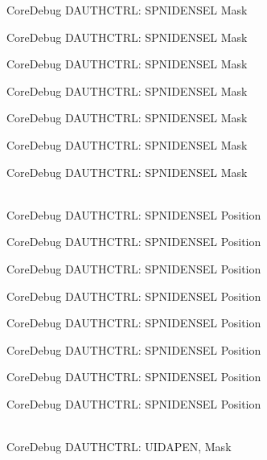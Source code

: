 \begin{DoxyRefList}
\label{deprecated__deprecated000142}%
%
Core\+Debug DAUTHCTRL:\+ SPNIDENSEL Mask 

\label{deprecated__deprecated000218}%
%
Core\+Debug DAUTHCTRL:\+ SPNIDENSEL Mask 

\label{deprecated__deprecated000281}%
%
Core\+Debug DAUTHCTRL:\+ SPNIDENSEL Mask 

\label{deprecated__deprecated000360}%
%
Core\+Debug DAUTHCTRL:\+ SPNIDENSEL Mask 

\label{deprecated__deprecated000436}%
%
Core\+Debug DAUTHCTRL:\+ SPNIDENSEL Mask 

\label{deprecated__deprecated000539}%
%
Core\+Debug DAUTHCTRL:\+ SPNIDENSEL Mask 

\label{deprecated__deprecated000641}%
%
Core\+Debug DAUTHCTRL:\+ SPNIDENSEL Mask  
\item[{\parbox[t]{\linewidth}{Global \doxylink{group__CMSIS__SCB_ga866734a8e4bec2d6cf091e265c6c0f3d}{Core\+Debug\+\_\+\+DAUTHCTRL\+\_\+\+SPNIDENSEL\+\_\+\+Pos} }}]\hfill \\
\label{deprecated__deprecated000087}%
%
Core\+Debug DAUTHCTRL:\+ SPNIDENSEL Position 

\label{deprecated__deprecated000141}%
%
Core\+Debug DAUTHCTRL:\+ SPNIDENSEL Position 

\label{deprecated__deprecated000217}%
%
Core\+Debug DAUTHCTRL:\+ SPNIDENSEL Position 

\label{deprecated__deprecated000280}%
%
Core\+Debug DAUTHCTRL:\+ SPNIDENSEL Position 

\label{deprecated__deprecated000359}%
%
Core\+Debug DAUTHCTRL:\+ SPNIDENSEL Position 

\label{deprecated__deprecated000435}%
%
Core\+Debug DAUTHCTRL:\+ SPNIDENSEL Position 

\label{deprecated__deprecated000538}%
%
Core\+Debug DAUTHCTRL:\+ SPNIDENSEL Position 

\label{deprecated__deprecated000640}%
%
Core\+Debug DAUTHCTRL:\+ SPNIDENSEL Position  
\item[{\parbox[t]{\linewidth}{Global \doxylink{group__CMSIS__SCB_gad69e7195bbc5074466387d9c4d8bd529}{Core\+Debug\+\_\+\+DAUTHCTRL\+\_\+\+UIDAPEN\+\_\+\+Msk} }}]\hfill \\
\label{deprecated__deprecated000082}%
%
Core\+Debug DAUTHCTRL:\+ UIDAPEN, Mask 


\end{DoxyRefList}
